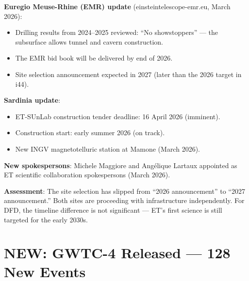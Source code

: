 \documentclass[11pt,a4paper]{article}
\newcommand{\NEW}{\textcolor{dfdblue}{\textbf{NEW}}}
\begin{document}
\begin{tcolorbox}[colback=blue!5!white, colframe=blue!60!black,
  title={\NEW: ET Site Selection --- ``All Signals Are Green'' (March 2026)}]

\textbf{Euregio Meuse-Rhine (EMR) update} (einsteintelescope-emr.eu, March 2026):
\begin{itemize}
\item Drilling results from 2024--2025 reviewed: ``No showstoppers'' --- the subsurface allows tunnel and cavern construction.
\item The EMR bid book will be delivered by end of 2026.
\item Site selection announcement expected in 2027 (later than the 2026 target in i44).
\end{itemize}

\textbf{Sardinia update}:
\begin{itemize}
\item ET-SUnLab construction tender deadline: 16 April 2026 (imminent).
\item Construction start: early summer 2026 (on track).
\item New INGV magnetotelluric station at Mamone (March 2026).
\end{itemize}

\textbf{New spokespersons}: Michele Maggiore and Ang\'elique Lartaux appointed as ET scientific collaboration spokespersons (March 2026).

\textbf{Assessment}: The site selection has slipped from ``2026 announcement'' to ``2027 announcement.'' Both sites are proceeding with infrastructure independently. For DFD, the timeline difference is not significant --- ET's first science is still targeted for the early 2030s.
\end{tcolorbox}

\section{\NEW: GWTC-4 Released --- 128 New Events}
\end{document}
